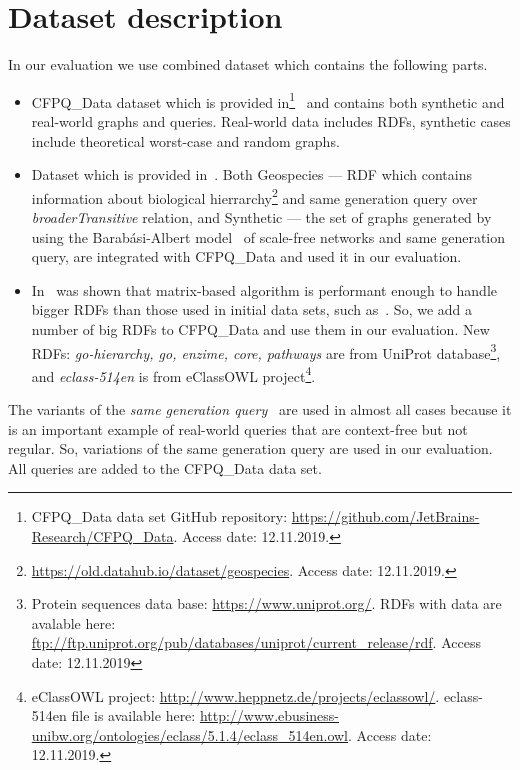 \section{Dataset description}

In our evaluation we use combined dataset which contains the following parts.
\begin{itemize}
\item CFPQ\_Data dataset which is provided in\footnote{CFPQ\_Data data set GitHub repository: \url{https://github.com/JetBrains-Research/CFPQ_Data}. Access date: 12.11.2019.}~\cite{Mishin:2019:ECP:3327964.3328503} and contains both synthetic and real-world graphs and queries.
Real-world data includes RDFs, synthetic cases include theoretical worst-case and random graphs.
\item Dataset which is provided in~\cite{Kuijpers:2019:ESC:3335783.3335791}. Both Geospecies --- RDF which contains information about biological hierrarchy\footnote{\url{https://old.datahub.io/dataset/geospecies}. Access date: 12.11.2019.} and same generation query over \textit{broaderTransitive} relation, and Synthetic --- the set of graphs generated by using the Barab\'asi-Albert model~\cite{Albert_statisticalmechanics} of scale-free networks and same generation query, are integrated with CFPQ\_Data and used it in our evaluation.
\item In~\cite{Mishin:2019:ECP:3327964.3328503} was shown that matrix-based algorithm is performant enough to handle bigger RDFs than those used in initial data sets, such as~\cite{RDF}.
So, we add a number of big RDFs to CFPQ\_Data and use them in our evaluation.
New RDFs: \textit{go-hierarchy, go, enzime, core, pathways} are from UniProt database\footnote{Protein sequences data base: \url{https://www.uniprot.org/}. RDFs with data are avalable here: \url{ftp://ftp.uniprot.org/pub/databases/uniprot/current_release/rdf}. Access date: 12.11.2019}, and \textit{eclass-514en} is from eClassOWL project\footnote{eClassOWL project: \url{http://www.heppnetz.de/projects/eclassowl/}. eclass-514en file is available here: \url{http://www.ebusiness-unibw.org/ontologies/eclass/5.1.4/eclass_514en.owl}. Access date: 12.11.2019.}.
\end{itemize}

The variants of the \textit{same generation query}~\cite{FndDB} are used in almost all cases because it is an important example of real-world queries that are context-free but not regular.
So, variations of the same generation query are used in our evaluation.
All queries are added to the CFPQ\_Data data set.

